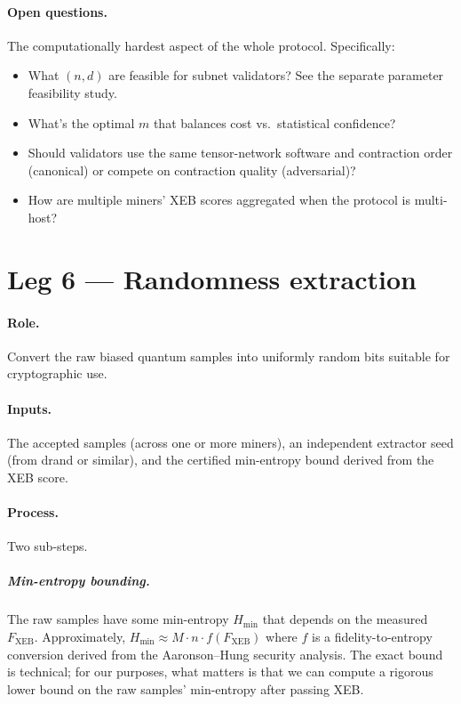 \documentclass[11pt]{article}
\begin{document}
\paragraph{Open questions.} The computationally hardest aspect of the whole protocol. Specifically:
\begin{itemize}
    \item What $(n, d)$ are feasible for subnet validators? See the separate parameter feasibility study.
    \item What's the optimal $m$ that balances cost vs.\ statistical confidence?
    \item Should validators use the same tensor-network software and contraction order (canonical) or compete on contraction quality (adversarial)?
    \item How are multiple miners' XEB scores aggregated when the protocol is multi-host?
\end{itemize}

\section{Leg 6 --- Randomness extraction}

\paragraph{Role.} Convert the raw biased quantum samples into uniformly random bits suitable for cryptographic use.

\paragraph{Inputs.} The accepted samples (across one or more miners), an independent extractor seed (from drand or similar), and the certified min-entropy bound derived from the XEB score.

\paragraph{Process.} Two sub-steps.

\subparagraph{Min-entropy bounding.} The raw samples have some min-entropy $H_{\min}$ that depends on the measured $F_{\text{XEB}}$. Approximately, $H_{\min} \approx M \cdot n \cdot f(F_{\text{XEB}})$ where $f$ is a fidelity-to-entropy conversion derived from the Aaronson--Hung security analysis. The exact bound is technical; for our purposes, what matters is that we can compute a rigorous lower bound on the raw samples' min-entropy after passing XEB.
\end{document}
